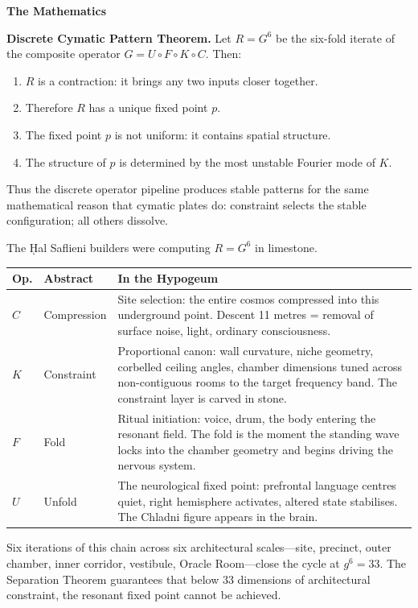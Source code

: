 \documentclass[11pt, twoside, openright]{book}
\theoremstyle{plain}
\theoremstyle{definition}
\newenvironment{mathbox}{%
  \begin{mdframed}[backgroundcolor=MathBox,linecolor=PrincipiaGold!80,linewidth=0.5pt,innertopmargin=6pt,innerbottommargin=6pt]
  \noindent\textbf{The Mathematics}\par\medskip}{\end{mdframed}}
\begin{document}
\begin{mathbox}
\textbf{Discrete Cymatic Pattern Theorem.}
Let $R = G^6$ be the six-fold iterate of the composite operator
$G = U \circ F \circ K \circ C$. Then:
\begin{enumerate}[label=\arabic*.]
  \item $R$ is a contraction: it brings any two inputs closer together.
  \item Therefore $R$ has a unique fixed point $p$.
  \item The fixed point $p$ is not uniform: it contains spatial structure.
  \item The structure of $p$ is determined by the most unstable Fourier
    mode of $K$.
\end{enumerate}
Thus the discrete operator pipeline produces stable patterns for the
same mathematical reason that cymatic plates do: constraint selects the
stable configuration; all others dissolve.

The \d{H}al Saflieni builders were computing $R = G^6$ in limestone.
\end{mathbox}

\bigskip
\begin{tabularx}{\textwidth}{@{}Q{1.2cm}P{2.0cm}L@{}}
\toprule
\textbf{Op.} & \textbf{Abstract} & \textbf{In the Hypogeum} \\
\midrule
$C$ & Compression &
  Site selection: the entire cosmos compressed into this underground
  point. Descent 11 metres = removal of surface noise, light,
  ordinary consciousness. \\[4pt]
$K$ & Constraint &
  Proportional canon: wall curvature, niche geometry, corbelled ceiling
  angles, chamber dimensions tuned across non-contiguous rooms to the
  target frequency band. The constraint layer is carved in stone. \\[4pt]
$F$ & Fold &
  Ritual initiation: voice, drum, the body entering the resonant
  field. The fold is the moment the standing wave locks into the chamber
  geometry and begins driving the nervous system. \\[4pt]
$U$ & Unfold &
  The neurological fixed point: prefrontal language centres quiet,
  right hemisphere activates, altered state stabilises.
  The Chladni figure appears in the brain. \\
\bottomrule
\end{tabularx}

\bigskip
Six iterations of this chain across six architectural scales---site,
precinct, outer chamber, inner corridor, vestibule, Oracle Room---close
the cycle at $g^6 = 33$. The Separation Theorem guarantees that below
33 dimensions of architectural constraint, the resonant fixed point
cannot be achieved.
\end{document}
